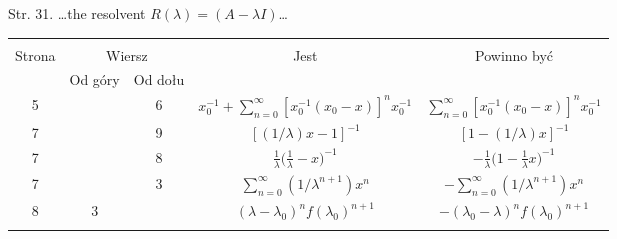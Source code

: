 \documentclass[a4paper,11pt]{article}
\begin{document}
Str. 31. \ldots the resolvent $R( \lambda ) = ( A - \lambda I )$\ldots













\newpage






\begin{center}

  \begin{tabular}{|c|c|c|c|c|}
    \hline
    & \multicolumn{2}{c|}{} & & \\
    Strona & \multicolumn{2}{c|}{Wiersz}& Jest
                              & Powinno być \\ \cline{2-3}
    & Od góry & Od dołu & & \\
    \hline
    5 & & 6 & $x_{ 0 }^{ -1 } + \sum\limits_{ n = 0 }^{ \infty }
              [ x_{ 0 }^{ -1 } ( x_{ 0 } - x ) ]^{ n } x_{ 0 }^{ -1 }$
           & $\sum\limits_{ n = 0 }^{ \infty } [ x_{ 0 }^{ -1 } ( x_{ 0 } - x ) ]^{ n }
             x_{ 0 }^{ -1 }$ \\
    7 & & 9 & $[ ( 1 / \lambda ) x - 1 ]^{ -1 }$
           & $[ 1 - ( 1 / \lambda ) x ]^{ -1 }$ \\
    7 & & 8 & $\frac{ 1 }{ \lambda } \big( \frac{ 1 }{ \lambda } - x \big)^{ -1 }$
           & $-\frac{ 1 }{ \lambda } \big( 1 - \frac{ 1 }{ \lambda } x \big)^{ -1 }$ \\
    7 & & 3 & $\sum\limits_{ n = 0 }^{ \infty } ( 1 / \lambda^{ n + 1 } ) x^{ n }$
           & $-\sum\limits_{ n = 0 }^{ \infty } ( 1 / \lambda^{ n + 1 } ) x^{ n }$ \\
    8 & 3 & & $( \lambda - \lambda_{ 0 } )^{ n } f( \lambda_{ 0 } )^{ n + 1 }$
           & $-( \lambda_{ 0 } - \lambda )^{ n } f( \lambda_{ 0 } )^{ n + 1 }$ \\
    & & & & \\
    \hline
  \end{tabular}

\end{center}
\end{document}
